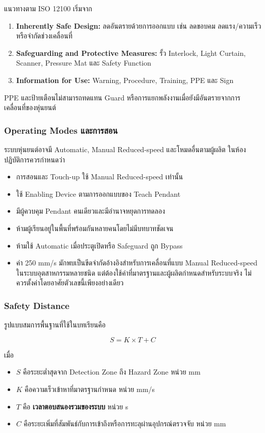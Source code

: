 แนวทางตาม ISO 12100 เริ่มจาก

\begin{enumerate}
    \item \textbf{Inherently Safe Design:} ลดอันตรายด้วยการออกแบบ เช่น ลดขอบคม ลดแรง/ความเร็ว หรือจำกัดช่วงเคลื่อนที่
    \item \textbf{Safeguarding and Protective Measures:} รั้ว Interlock, Light Curtain, Scanner, Pressure Mat และ Safety Function
    \item \textbf{Information for Use:} Warning, Procedure, Training, PPE และ Sign
\end{enumerate}

PPE และป้ายเตือนไม่สามารถทดแทน Guard หรือการแยกพลังงานเมื่อยังมีอันตรายจากการเคลื่อนที่ของหุ่นยนต์

\subsubsection{Operating Modes และการสอน}

ระบบหุ่นยนต์อาจมี Automatic, Manual Reduced-speed และโหมดอื่นตามผู้ผลิต ในห้องปฏิบัติการควรกำหนดว่า

\begin{itemize}
    \item การสอนและ Touch-up ใช้ Manual Reduced-speed เท่านั้น
    \item ใช้ Enabling Device ตามการออกแบบของ Teach Pendant
    \item มีผู้ควบคุม Pendant คนเดียวและมีอำนาจหยุดการทดลอง
    \item ห้ามผู้เรียนอยู่ในพื้นที่พร้อมกันหลายคนโดยไม่มีบทบาทชัดเจน
    \item ห้ามใช้ Automatic เมื่อประตูเปิดหรือ Safeguard ถูก Bypass
    \item ค่า 250 mm/s มักพบเป็นขีดจำกัดอ้างอิงสำหรับการเคลื่อนที่แบบ Manual Reduced-speed ในระบบอุตสาหกรรมหลายชนิด แต่ต้องใช้ค่าที่มาตรฐานและผู้ผลิตกำหนดสำหรับระบบจริง ไม่ควรตั้งค่าโดยอาศัยตัวเลขนี้เพียงอย่างเดียว
\end{itemize}

\subsubsection{Safety Distance}

รูปแบบสมการพื้นฐานที่ใช้ในบทเรียนคือ

\[
S=K\times T+C
\]

เมื่อ

\begin{itemize}
    \item $S$ คือระยะต่ำสุดจาก Detection Zone ถึง Hazard Zone หน่วย mm
    \item $K$ คือความเร็วเข้าหาที่มาตรฐานกำหนด หน่วย mm/s
    \item $T$ คือ \textbf{เวลาตอบสนองรวมของระบบ} หน่วย s
    \item $C$ คือระยะเพิ่มที่สัมพันธ์กับการเข้าถึงหรือการทะลุผ่านอุปกรณ์ตรวจจับ หน่วย mm
\end{itemize}

